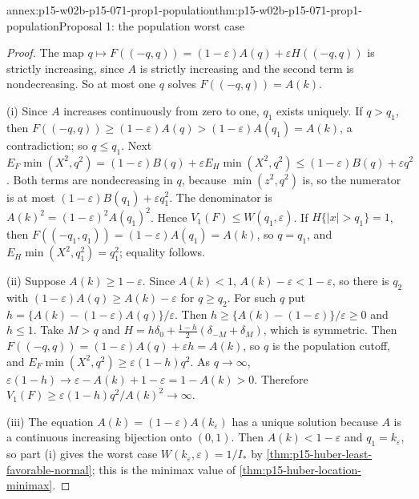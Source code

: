 \begin{annexitem}{annex:p15-w02b-p15-071-prop1-population}{thm:p15-w02b-p15-071-prop1-population}{Proposal 1: the population worst case}
\begin{proof}
The map \(q\mapsto F((-q,q))=(1-\varepsilon)A(q)+\varepsilon H((-q,q))\)
is strictly increasing, since \(A\) is strictly increasing and the second
term is nondecreasing. So at most one \(q\) solves \(F((-q,q))=A(k)\).

(i) Since \(A\) increases continuously from zero to one, \(q_1\) exists
uniquely. If \(q>q_1\), then
\(F((-q,q))\geq(1-\varepsilon)A(q)>(1-\varepsilon)A(q_1)=A(k)\), a
contradiction; so \(q\leq q_1\). Next
\(E_F\min(X^2,q^2)=(1-\varepsilon)B(q)+\varepsilon E_H\min(X^2,q^2)
\leq(1-\varepsilon)B(q)+\varepsilon q^2\). Both terms are nondecreasing
in \(q\), because \(\min(z^2,q^2)\) is, so the numerator is at most
\((1-\varepsilon)B(q_1)+\varepsilon q_1^2\). The denominator is
\(A(k)^2=(1-\varepsilon)^2A(q_1)^2\). Hence
\(V_1(F)\leq W(q_1,\varepsilon)\). If \(H\{|x|>q_1\}=1\), then
\(F((-q_1,q_1))=(1-\varepsilon)A(q_1)=A(k)\), so \(q=q_1\), and
\(E_H\min(X^2,q_1^2)=q_1^2\); equality follows.

(ii) Suppose \(A(k)\geq1-\varepsilon\). Since \(A(k)<1\),
\(A(k)-\varepsilon<1-\varepsilon\), so there is \(q_2\) with
\((1-\varepsilon)A(q)\geq A(k)-\varepsilon\) for \(q\geq q_2\).
For such \(q\) put \(h=\{A(k)-(1-\varepsilon)A(q)\}/\varepsilon\).
Then \(h\geq\{A(k)-(1-\varepsilon)\}/\varepsilon\geq0\) and \(h\leq1\).
Take \(M>q\) and
\(H=h\delta_0+\tfrac{1-h}2(\delta_{-M}+\delta_M)\), which is symmetric.
Then \(F((-q,q))=(1-\varepsilon)A(q)+\varepsilon h=A(k)\), so \(q\) is
the population cutoff, and
\(E_F\min(X^2,q^2)\geq\varepsilon(1-h)q^2\).
As \(q\to\infty\), \(\varepsilon(1-h)\to\varepsilon-A(k)+1-\varepsilon
=1-A(k)>0\). Therefore \(V_1(F)\geq\varepsilon(1-h)q^2/A(k)^2\to\infty\).

(iii) The equation \(A(k)=(1-\varepsilon)A(k_\varepsilon)\) has a unique
solution because \(A\) is a continuous increasing bijection onto
\((0,1)\). Then \(A(k)<1-\varepsilon\) and \(q_1=k_\varepsilon\), so part
(i) gives the worst case \(W(k_\varepsilon,\varepsilon)=1/I_*\) by
\cref{thm:p15-huber-least-favorable-normal}; this is the minimax value of
\cref{thm:p15-huber-location-minimax}.
\end{proof}
\end{annexitem}

